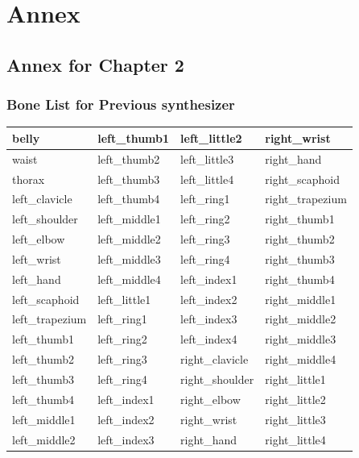 \documentclass[../main.tex]{subfiles}
\begin{document}
\chapter{Annex}

\section{Annex for Chapter 2}
\label{annex:background_work}

\subsection{Bone List for Previous synthesizer}
\label{annex:background_work:old_bone_list}

\begin{longtable}{|l|l|l|l|}
    \hline
    belly & left\_thumb1 & left\_little2 & right\_wrist \\ \hline
    waist & left\_thumb2 & left\_little3 & right\_hand \\ \hline
    thorax & left\_thumb3 & left\_little4 & right\_scaphoid \\ \hline
    left\_clavicle & left\_thumb4 & left\_ring1 & right\_trapezium \\ \hline
    left\_shoulder & left\_middle1 & left\_ring2 & right\_thumb1 \\ \hline
    left\_elbow & left\_middle2 & left\_ring3 & right\_thumb2 \\ \hline
    left\_wrist & left\_middle3 & left\_ring4 & right\_thumb3 \\ \hline
    left\_hand & left\_middle4 & left\_index1 & right\_thumb4 \\ \hline
    left\_scaphoid & left\_little1 & left\_index2 & right\_middle1 \\ \hline
    left\_trapezium & left\_ring1 & left\_index3 & right\_middle2 \\ \hline
    left\_thumb1 & left\_ring2 & left\_index4 & right\_middle3 \\ \hline
    left\_thumb2 & left\_ring3 & right\_clavicle & right\_middle4 \\ \hline
    left\_thumb3 & left\_ring4 & right\_shoulder & right\_little1 \\ \hline
    left\_thumb4 & left\_index1 & right\_elbow & right\_little2 \\ \hline
    left\_middle1 & left\_index2 & right\_wrist & right\_little3 \\ \hline
    left\_middle2 & left\_index3 & right\_hand & right\_little4 \\ \hline

\end{longtable}
\end{document}
